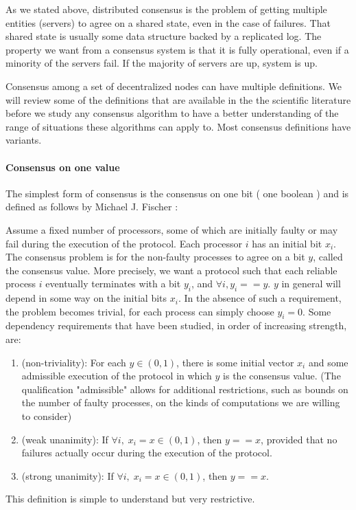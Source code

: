 \documentclass[11pt, twocolumn]{article}
\begin{document}
As we stated above, distributed consensus is the problem of getting multiple entities (servers) to agree on a shared state, even in the case of failures.
That shared state is usually some data structure backed by a replicated log.
The property we want from a consensus system is that it is fully operational, even if a minority of the servers fail.
If the majority of servers are up, system is up.

Consensus among a set of decentralized nodes can have multiple definitions.
We will review some of the definitions that are available in the the scientific literature before
we study any consensus algorithm to have a better understanding of the range of situations these algorithms can apply to.
Most consensus definitions have variants.

\paragraph{Consensus on one value}

The simplest form of consensus is the consensus on one bit ( one boolean ) and is defined as follows by Michael J. Fischer \cite{consensusproblem}:

\begin{displayquote}
    Assume a fixed number of processors, some of which are initially faulty or may fail during the execution of the protocol.
    Each processor $i$ has an initial bit $x_i$. The consensus problem is for the non-faulty processes to agree on a bit $y$, called the consensus value.
    More precisely, we want a protocol such that each reliable process $i$ eventually terminates with a bit $y_i$, and \( \forall i, y_i == y \). $y$ in general will depend in some way on the initial bits $x_i$.
    In the absence of such a requirement, the problem becomes trivial, for each process can simply choose $y_i = 0$.
    Some dependency requirements that have been studied, in order of increasing strength, are:
    \begin{enumerate}
        \item (non-triviality): For each \( y \in (0, 1)\), there is some initial vector \( x_{i}\) and some admissible execution of the protocol in which $y$ is the consensus value. (The qualification "admissible" allows for additional restrictions, such as bounds on the number of faulty processes, on the kinds of computations we are willing to consider)
        \item (weak unanimity): If \(\forall i,\;x_{i} = x \in (0, 1)\), then \(y == x\), provided that no failures actually occur during the execution of the protocol.
        \item (strong unanimity): If \(\forall i,\;x_{i} = x \in (0, 1)\), then \(y == x\).
    \end{enumerate}

\end{displayquote}
This definition is simple to understand but very restrictive.
\end{document}
